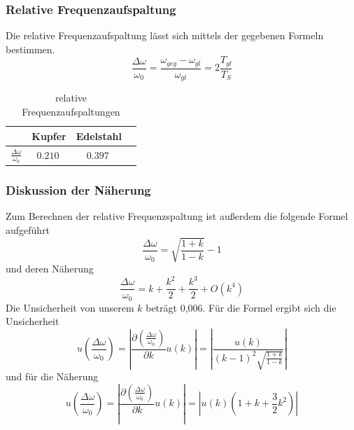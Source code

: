 \documentclass[
	a4paper,
	12pt,
	pagesize,
	ngerman
]{scrartcl}
\begin{document}
	\subsubsection{Relative Frequenzaufspaltung}
	Die relative Frequenzaufspaltung lässt sich mittels der gegebenen Formeln bestimmen.
	\begin{equation}
		\frac{\Delta\omega}{\omega_0} = \frac{\omega_{geg}-\omega_{gl}}{\omega_{gl}} = 2\frac{T_{gl}}{T_S}
	\end{equation}

	\begin{table}[H]
	\centering
	\begin{tabular}{ l | c | c | c |}
		& Kupfer & Edelstahl  \\ \hline
		$\frac{\Delta\omega}{\omega_0}  $ &$\SI{0,210}{}$&$\SI{0,397}{}$\\  \hline
	\end{tabular}
	\caption{relative Frequenzaufspaltungen}
	\end{table}

	\subsubsection{Diskussion der Näherung}
	Zum Berechnen der relative Frequenzspaltung ist außerdem die folgende Formel aufgeführt
	\begin{equation}
		\frac{\Delta\omega}{\omega_0} = \sqrt{\frac{1+k}{1-k}} -1 
	\end{equation}
	und deren Näherung
	\begin{equation}
		\frac{\Delta\omega}{\omega_0} = k + \frac{k^2}{2} + \frac{k^3}{2} + O(k^4)
	\end{equation}
	Die Unsicherheit von unserem $k$ beträgt 0,006. Für die Formel ergibt sich die Unsicherheit
	\begin{equation}
		u\left({\frac{\Delta\omega}{\omega_0}}\right) = \left| \frac{\partial (\frac{\Delta\omega}{\omega_0})}{\partial k} u(k)\right| = \left|\frac{u(k)}{(k-1)^2\sqrt{\frac{1+k}{1-k}}} \right|
	\end{equation}
	und für die Näherung
	\begin{equation}
		u\left({\frac{\Delta\omega}{\omega_0}}\right) = \left| \frac{\partial (\frac{\Delta\omega}{\omega_0})}{\partial k} u(k)\right| = \left| u(k)(1+k+\frac{3}{2}k^2) \right|
	\end{equation}
\end{document}
